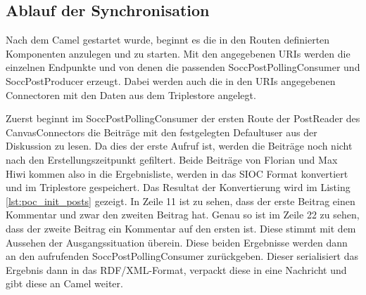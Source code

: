 
\subsection{Ablauf der Synchronisation} %
\label{sub:ablauf_der_synchronisierung}

Nach dem Camel gestartet wurde, beginnt es die in den Routen definierten Komponenten anzulegen und zu starten. Mit den angegebenen URIs werden die einzelnen Endpunkte und von denen die passenden SoccPostPollingConsumer und SoccPostProducer erzeugt. Dabei werden auch die in den URIs angegebenen Connectoren mit den Daten aus dem Triplestore angelegt.

Zuerst beginnt im SoccPostPollingConsumer der ersten Route der PostReader des CanvasConnectors die Beiträge mit den festgelegten Defaultuser aus der Diskussion zu lesen. Da dies der erste Aufruf ist, werden die Beiträge noch nicht nach den Erstellungszeitpunkt gefiltert. Beide Beiträge von Florian und Max Hiwi kommen also in die Ergebnisliste, werden in das SIOC Format konvertiert und im Triplestore gespeichert. Das Resultat der Konvertierung wird im Listing \ref{lst:poc_init_posts} gezeigt. In Zeile 11 ist zu sehen, dass der erste Beitrag einen Kommentar und zwar den zweiten Beitrag hat. Genau so ist im Zeile 22 zu sehen, dass der zweite Beitrag ein Kommentar auf den ersten ist. Diese stimmt mit dem Aussehen der Ausgangssituation überein. Diese beiden Ergebnisse werden dann an den aufrufenden SoccPostPollingConsumer zurückgeben. Dieser serialisiert das Ergebnis dann in das RDF/XML-Format, verpackt diese in eine Nachricht und gibt diese an Camel weiter.


